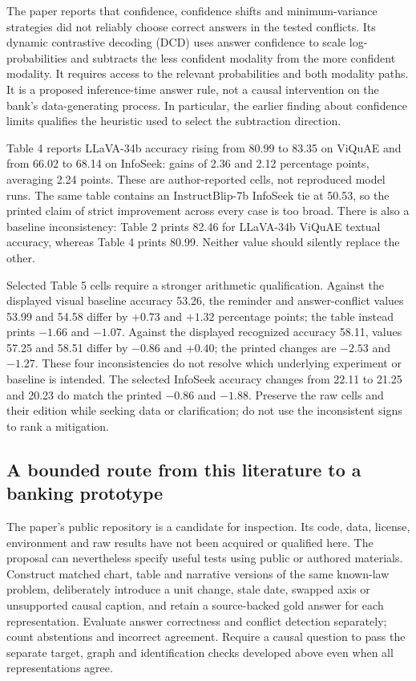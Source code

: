 The paper reports that confidence, confidence shifts and minimum-variance
strategies did not reliably choose correct answers in the tested conflicts.
Its dynamic contrastive decoding (DCD) uses answer confidence to scale
log-probabilities and subtracts the less confident modality from the more
confident modality. It requires access to the relevant probabilities and
both modality paths. It is a proposed inference-time answer rule, not a
causal intervention on the bank's data-generating process. In particular,
the earlier finding about confidence limits qualifies the heuristic used
to select the subtraction direction.~\citep{exec23_cross_modality_conflict}

Table 4 reports LLaVA-34b accuracy rising from 80.99 to 83.35 on ViQuAE and
from 66.02 to 68.14 on InfoSeek: gains of 2.36 and 2.12 percentage points,
averaging 2.24 points. These are author-reported cells, not reproduced model
runs. The same table contains an InstructBlip-7b InfoSeek tie at 50.53, so
the printed claim of strict improvement across every case is too broad.
There is also a baseline inconsistency: Table 2 prints 82.46 for LLaVA-34b
ViQuAE textual accuracy, whereas Table 4 prints 80.99. Neither value should
silently replace the other.~\citep{exec23_cross_modality_conflict,exec23_context_reference}

Selected Table 5 cells require a stronger arithmetic qualification. Against
the displayed visual baseline accuracy 53.26, the reminder and answer-conflict
values 53.99 and 54.58 differ by $+0.73$ and $+1.32$ percentage points;
the table instead prints $-1.66$ and $-1.07$. Against the displayed recognized
accuracy 58.11, values 57.25 and 58.51 differ by $-0.86$ and $+0.40$;
the printed changes are $-2.53$ and $-1.27$. These four inconsistencies do
not resolve which underlying experiment or baseline is intended. The selected
InfoSeek accuracy changes from 22.11 to 21.25 and 20.23 do match the printed
$-0.86$ and $-1.88$. Preserve the raw cells and their edition while seeking
data or clarification; do not use the inconsistent signs to rank a mitigation.
\citep{exec23_cross_modality_conflict,exec23_context_reference}

\subsection{A bounded route from this literature to a banking prototype}
\label{exec23:conflict-prototype}

The paper's public repository is a candidate for inspection. Its code, data,
license, environment and raw results have not been acquired or qualified here.
The proposal can nevertheless specify useful tests using public or authored
materials. Construct matched chart, table and narrative versions of the same
known-law problem, deliberately introduce a unit change, stale date, swapped
axis or unsupported causal caption, and retain a source-backed gold answer
for each representation. Evaluate answer correctness and conflict detection
separately; count abstentions and incorrect agreement. Require a causal
question to pass the separate target, graph and identification checks developed
above even when all representations agree.

